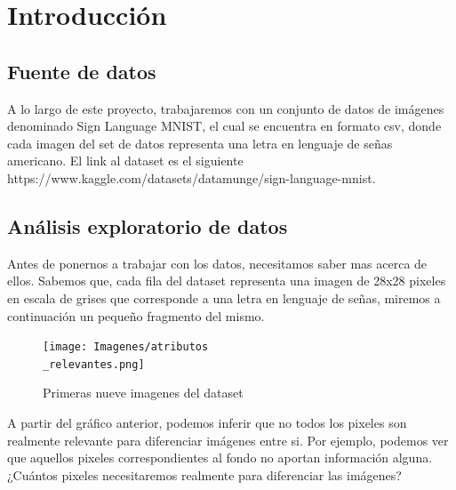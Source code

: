 \documentclass[10pt,a4paper]{article}
\begin{document}
\maketitle

\section{Introducción}  \vspace{0.1cm}

\subsection{Fuente de datos} \vspace{0.1cm}

A lo largo de este proyecto, trabajaremos con un conjunto de datos de imágenes denominado Sign
Language MNIST, el cual se encuentra en formato csv, donde cada imagen del set de datos representa una letra en lenguaje de
señas americano. El link al dataset es el siguiente https://www.kaggle.com/datasets/datamunge/sign-language-mnist.

\subsection{Análisis exploratorio de datos}  \vspace{0.1cm}

Antes de ponernos a trabajar con los datos, necesitamos saber mas acerca de ellos. Sabemos que, cada fila del dataset representa una imagen de 28x28 pixeles en escala de grises que corresponde a una letra en lenguaje de señas, miremos a continuación un pequeño fragmento del mismo.

 \vspace{0.1cm}

\begin{figure}[h]
  \centering
  \texttt{[image: Imagenes/atributos\\\_relevantes.png]}
  \caption{Primeras nueve imagenes del dataset}
  \label{fig:Tabla 1}
\end{figure}

 \vspace{0.1cm}

A partir del gráfico anterior, podemos inferir que no todos los pixeles son realmente relevante para diferenciar imágenes entre si. Por ejemplo, podemos ver
que aquellos pixeles correspondientes al fondo no aportan información alguna. ¿Cuántos pixeles necesitaremos realmente para diferenciar las imágenes? \vspace{0.05cm}
\end{document}
